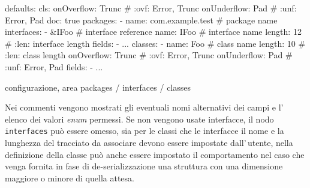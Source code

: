 \documentclass[a4paper,10pt]{report}
\newif\ifesource
\newenvironment{elisting}[1][H]
  {\captionsetup{aboveskip=0pt}\begin{listing}[#1]}
  {\end{listing}%
}
\begin{document}
\ifesource
\begin{figure*}[!htb]
\begin{lstlisting}[language=yaml, 
caption={configurazione, area packages / interfaces / classes}, 
label=lst:pakg-conf]
defaults:
  cls:
    onOverflow: Trunc   # :ovf: Error, Trunc
    onUnderflow: Pad    # :unf: Error, Pad
    doc: true
packages:
  - name: com.example.test  # package name
    interfaces:
      - &IFoo         (*\color{purple}{\# interface reference}*)
        name: IFoo    # interface name
        length: 12    # :len: interface length
        fields:
          - ...
    classes:
      - name: Foo           # class name
        length: 10          # :len: class length
        onOverflow: Trunc   # :ovf: Error, Trunc
        onUnderflow: Pad    # :unf: Error, Pad
        fields:
          - ...
\end{lstlisting}
\end{figure*}
\else
\begin{elisting}[!htb]
\begin{yamlcode}
defaults:
  cls:
    onOverflow: Trunc   # :ovf: Error, Trunc
    onUnderflow: Pad    # :unf: Error, Pad
    doc: true
packages:
  - name: com.example.test  # package name
    interfaces:
      - &IFoo         # interface reference
        name: IFoo    # interface name
        length: 12    # :len: interface length
        fields:
          - ...
    classes:
      - name: Foo           # class name
        length: 10          # :len: class length
        onOverflow: Trunc   # :ovf: Error, Trunc
        onUnderflow: Pad    # :unf: Error, Pad
        fields:
          - ...
\end{yamlcode}
\caption{configurazione, area packages / interfaces / classes}
\label{lst:pakg-conf}
\end{elisting}
\fi
Nei commenti vengono mostrati gli eventuali nomi alternativi dei campi e 
l'\,elenco dei valori \textsl{enum} permessi.
Se non vengono usate interfacce, il nodo \texttt{interfaces} può essere omesso,
sia per le classi che le interfacce il nome e la lunghezza del tracciato da 
associare devono essere impostate dall'\,utente, nella definizione della classe
può anche essere impostato il comportamento nel caso che venga fornita in fase
di de-serializzazione una struttura con una dimensione maggiore o minore di 
quella attesa.
\end{document}
